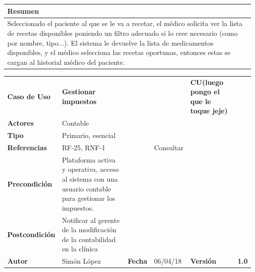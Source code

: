 \documentclass[11pt,a4paper]{article}
\begin{document}
\begin{table}[H]
	\centering
	\begin{tabular}{l}
		\hline
		\multicolumn{1}{|l|}{Resumen} \\ \hline
		Seleccionado el paciente al que se le va a recetar, el médico solicita ver la lista de recetas disponibles poniendo un filtro adecuado si lo cree necesario (como por nombre, tipo...). El sistema le devuelve la lista de medicamentos disponibles, y el médico selecciona las recetas oportunas, entonces estas se cargan al historial médico del paciente.
	\end{tabular}
\end{table}


\begin{table}[H]
	\centering
	\begin{tabular}{|l|lllll}
		\cline{1-1} \cline{6-6}
		\textbf{Caso de Uso}   & \textbf{Gestionar impuestos} &   &  & \multicolumn{1}{l|}{\textbf{\textbf{CU(luego pongo el que le toque jeje)}}}        & \multicolumn{1}{l|}{\textbf{}} \\ \cline{1-1} \cline{6-6} 
		\textbf{Actores}       & Contable &                                     &                       &                                       & \textbf{}                      \\ \cline{1-1}
		\textbf{Tipo}          & Primario, esencial  &                                     &                       &                                       & \textbf{}                      \\ \cline{1-1}
		\textbf{Referencias}   & RF-25, RNF-1                          &     & Consultar                       &                                       & \textbf{}                      \\ \cline{1-1}
		\textbf{Precondición}  & Plataforma activa y operativa, acceso al sistema con una usuario contable para gestionar los impuestos.       &                      &                & \textbf{}                      \\ \cline{1-1}
		\textbf{Postcondición} & Notificar al gerente de la modificación de la contabilidad en la clínica                &                      &                &                &               \\ \cline{1-1} \cline{3-3} \cline{5-5}
		\textbf{Autor}         & \multicolumn{1}{l|}{Simón López} & \multicolumn{1}{l|}{\textbf{Fecha}} & \multicolumn{1}{l|}{06/04/18} & \multicolumn{1}{l|}{\textbf{Versión}} & \textbf{1.0}                      \\ \cline{1-1} \cline{3-3} \cline{5-5}
	\end{tabular}
\end{table}
\end{document}
